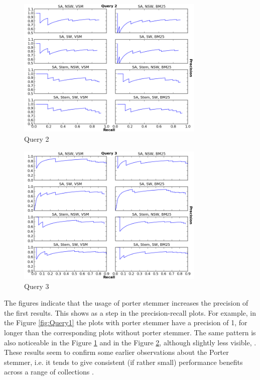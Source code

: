 \begin{figure}[ht]
  \centering
  \includegraphics[width=0.8\textwidth]{Query2.png}
  \caption{Query 2 }
  \label{fig:Query2}
\end{figure}
\FloatBarrier

\begin{figure}[ht]
  \centering
  \includegraphics[width=0.8\textwidth]{Query3.png}
  \caption{Query 3 }
  \label{fig:Query3}
\end{figure}
\FloatBarrier

 

The figures indicate that the usage of porter stemmer increases the precision of the first results. This shows as a step in the precision-recall plots. For example, in the Figure \ref{fig:Query1} the plots with porter stemmer have a precision of 1, for longer than the corresponding plots without porter stemmer. The same pattern is also noticeable in the Figure \ref{fig:Query2} and in the Figure \ref{fig:Query3}, although slightly less visible, . These results seem to confirm some earlier observations about the Porter stemmer, i.e. it tends to give consistent (if rather small) performance benefits across a range of collections \citep{croft1994corpus}. 


